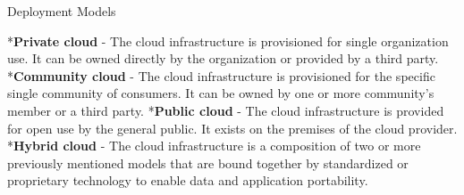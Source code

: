 \seccc Deployment Models

\begitems
	*{\bf Private cloud} - The cloud infrastructure is provisioned for single organization use. It can be owned directly by the organization or provided by a third party.
	*{\bf Community cloud} - The cloud infrastructure is provisioned for the specific single community of consumers. It can be owned by one or more community's member or a third party.
	*{\bf Public cloud} - The cloud infrastructure is provided for open use by the general public. It exists on the premises of the cloud provider.
	*{\bf Hybrid cloud} - The cloud infrastructure is a composition of two or more previously mentioned models that are bound together by standardized or proprietary technology to enable data and application portability.
	
\enditems

